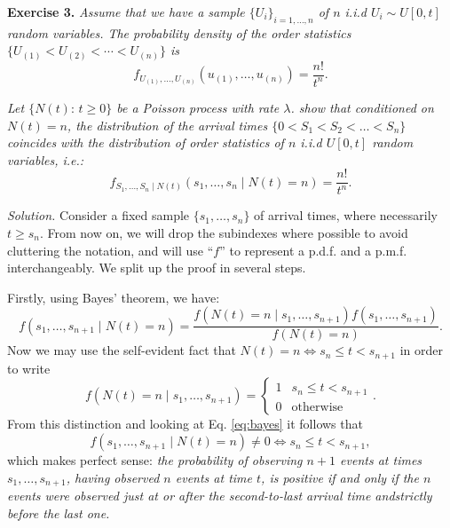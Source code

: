 
\textbf{Exercise 3. }\emph{Assume that we have a sample \( \{U_{i}\}_{i=1,\dots,n} \) of \( n \) i.i.d  \(U_{i} \sim U[0, t] \) random variables. The probability density of the order statistics \( \{U_{(1)} < U_{(2)} < \cdots < U_{(n)}\} \)  is}
\[
  f_{U_{(1)},\dots,U_{(n)}}(u_{(1)},\dots,u_{(n)}) = \frac{n!}{t^{n}}.
\]

\emph{Let \( \{N(t): \, t \geq 0\} \) be a Poisson process with rate \( \lambda \). show that conditioned on \( N(t) = n \), the distribution of the arrival times \( \{0 < S_{1} < S_{2} < \dots < S_{n}\} \) coincides with the distribution of order statistics of \( n \) i.i.d \( U[0, t] \) random variables, i.e.:}
\[
  f_{S_{1},\dots,S_{n} \mid N(t)}(s_{1},\dots, s_{n} \mid N(t) = n) = \frac{n!}{t^{n}}.
\]

\emph{Solution.} Consider a fixed sample $\{s_1, \dots, s_n\}$ of arrival times, where necessarily $t\geq s_n$. From now on, we will drop the subindexes where possible to avoid cluttering the notation, and will use ``$f$'' to represent a p.d.f. and a p.m.f. interchangeably. We split up the proof in several steps.

Firstly, using Bayes' theorem, we have:
\begin{equation}
  \label{eq:bayes}
  f(s_{1},\dots, s_{n+1} \mid N(t) = n) = \frac{ f(N(t) = n \mid s_{1},\dots, s_{n+1}) f(s_{1},\dots, s_{n+1})  }{ f(N(t) = n)  }.
\end{equation}
Now we may use the self-evident fact that \( N(t) = n \iff s_{n} \leq t < s_{n+1} \) in order to write
\[
  f(N(t) = n \mid s_{1},\dots, s_{n+1}) = \begin{cases} 1 & s_{n} \leq t < s_{n+1}\\ 0 &\text{otherwise} \end{cases}.
\]
From this distinction and looking at Eq. \eqref{eq:bayes} it follows that
\[
   f(s_{1},\dots,s_{n+1} \mid N(t) = n) \neq 0 \iff s_{n} \leq t < s_{n+1},
 \]
 which makes perfect sense: \emph{the probability of observing $n+1$ events at times $s_1, \dots, s_{n+1}$, having observed $n$ events at time $t$, is positive if and only if the $n$ events were observed just at or after the second-to-last arrival time andstrictly before the last one.}


